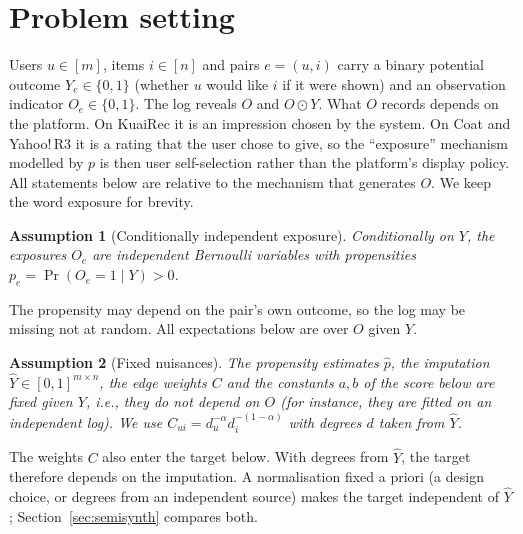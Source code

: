 \documentclass[preprint,review,12pt,authoryear]{elsarticle}
\newtheorem{assumption}{Assumption}
\theoremstyle{definition}
\begin{document}
\section{Problem setting}

Users $u\in[m]$, items $i\in[n]$ and pairs $e=(u,i)$ carry a binary potential
outcome $Y_e\in\{0,1\}$ (whether $u$ would like $i$ if it were shown) and an
observation indicator $O_e\in\{0,1\}$. The log reveals $O$ and $O\odot Y$. What
$O$ records depends on the platform. On KuaiRec it is an impression chosen by
the system. On Coat and Yahoo!\,R3 it is a rating that the user chose to give,
so the ``exposure'' mechanism modelled by $p$ is then user self-selection
rather than the platform's display policy. All statements below are relative
to the mechanism that generates $O$. We keep the word exposure for brevity.

\begin{assumption}[Conditionally independent exposure]\label{as:unconf}
Conditionally on $Y$, the exposures $O_e$ are independent Bernoulli variables
with propensities $p_e=\Pr(O_e=1\mid Y)>0$.
\end{assumption}
The propensity may depend on the pair's own outcome, so the log may be missing
not at random. All expectations below are over $O$ given $Y$.

\begin{assumption}[Fixed nuisances]\label{as:fixed}
The propensity estimates $\hat p$, the imputation $\hat Y\in[0,1]^{m\times n}$,
the edge weights $C$ and the constants $a,b$ of the score below are fixed
given $Y$, i.e., they do not depend on $O$ (for instance, they are fitted on
an independent log). We use $C_{ui}=d_u^{-\alpha}d_i^{-(1-\alpha)}$ with degrees
$d$ taken from $\hat Y$.
\end{assumption}
The weights $C$ also enter the target below. With degrees from $\hat Y$, the
target therefore depends on the imputation. A normalisation fixed a priori (a
design choice, or degrees from an independent source) makes the target
independent of $\hat Y$; Section~\ref{sec:semisynth} compares both.
\end{document}
